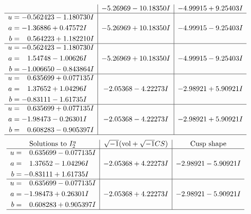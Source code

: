 \documentclass[1p]{elsarticle_modified}
\theoremstyle{definition}
\newcommand{\I}{\sqrt{-1}}
\begin{document}
$$\begin{array}{c|c|c}
 & -5.26969 - 10.18350 I & -4.99915 + 9.25403 I \\ \hline\begin{aligned}
u &= -0.562423 - 1.180730 I \\
a &= -1.36886 + 0.47572 I \\
b &= \phantom{-}0.564223 + 1.182210 I\end{aligned}
 & -5.26969 + 10.18350 I & -4.99915 - 9.25403 I \\ \hline\begin{aligned}
u &= -0.562423 - 1.180730 I \\
a &= \phantom{-}1.54748 - 1.00626 I \\
b &= -1.006650 - 0.843864 I\end{aligned}
 & -5.26969 + 10.18350 I & -4.99915 - 9.25403 I \\ \hline\begin{aligned}
u &= \phantom{-}0.635699 + 0.077135 I \\
a &= \phantom{-}1.37652 + 1.04296 I \\
b &= -0.83111 - 1.61735 I\end{aligned}
 & -2.05368 - 4.22273 I & -2.98921 + 5.90921 I \\ \hline\begin{aligned}
u &= \phantom{-}0.635699 + 0.077135 I \\
a &= -1.98473 - 0.26301 I \\
b &= \phantom{-}0.608283 - 0.905397 I\end{aligned}
 & -2.05368 - 4.22273 I & -2.98921 + 5.90921 I\\
 \hline 
 \end{array}$$\newpage$$\begin{array}{c|c|c}  
\text{Solutions to }I^u_{2}& \I (\text{vol} + \sqrt{-1}CS) & \text{Cusp shape}\\
 \hline 
\begin{aligned}
u &= \phantom{-}0.635699 - 0.077135 I \\
a &= \phantom{-}1.37652 - 1.04296 I \\
b &= -0.83111 + 1.61735 I\end{aligned}
 & -2.05368 + 4.22273 I & -2.98921 - 5.90921 I \\ \hline\begin{aligned}
u &= \phantom{-}0.635699 - 0.077135 I \\
a &= -1.98473 + 0.26301 I \\
b &= \phantom{-}0.608283 + 0.905397 I\end{aligned}
 & -2.05368 + 4.22273 I & -2.98921 - 5.90921 I\\
 \hline 
 \end{array}$$\newpage\newpage\renewcommand{\arraystretch}{1}
\end{document}
